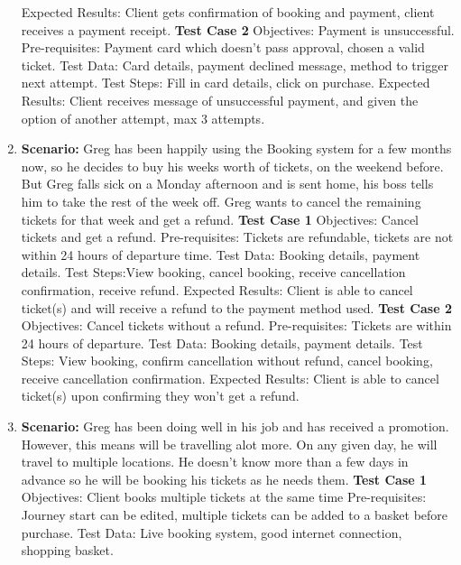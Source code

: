 \documentclass{article}
\begin{document}
\begin{enumerate}
		\subitem Expected Results: Client gets confirmation of booking and payment, client receives a payment receipt.
		\subitem \textbf{Test Case 2}
		\subitem Objectives: Payment is unsuccessful.
		\subitem Pre-requisites: Payment card which doesn't pass approval, chosen a valid ticket.
		\subitem Test Data: Card details, payment declined message, method to trigger next attempt.
		\subitem Test Steps: Fill in card details, click on purchase.
		\subitem Expected Results: Client receives message of unsuccessful payment, and given the option of another attempt, max 3 attempts.
		\newline
	\item \textbf{Scenario:} Greg has been happily using the Booking system for a few months now, so he decides to buy his weeks worth of tickets, on the weekend before. But Greg falls sick on a Monday afternoon and is sent home, his boss tells him to take the rest of the week off. Greg wants to cancel the remaining tickets for that week and get a refund.
		\subitem \textbf{Test Case 1}
		\subitem Objectives: Cancel tickets and get a refund.
		\subitem Pre-requisites: Tickets are refundable, tickets are not within 24 hours of departure time.
		\subitem Test Data: Booking details, payment details.
		\subitem Test Steps:View booking, cancel booking, receive cancellation confirmation, receive refund.
		\subitem Expected Results: Client is able to cancel ticket(s) and will receive a refund to the payment method used.
		\subitem \textbf{Test Case 2}
		\subitem Objectives: Cancel tickets without a refund.
		\subitem Pre-requisites: Tickets are within 24 hours of departure.
		\subitem Test Data: Booking details, payment details.
		\subitem Test Steps: View booking, confirm cancellation without refund, cancel booking, receive cancellation confirmation.
		\subitem Expected Results: Client is able to cancel ticket(s) upon confirming they won't get a refund.
		\newline
	\item \textbf{Scenario:} Greg has been doing well in his job and has received a promotion. However, this means will be travelling alot more. On any given day, he will travel to multiple locations. He doesn't know more than a few days in advance so he will be booking his tickets as he needs them.
		\subitem \textbf{Test Case 1}
		\subitem Objectives: Client books multiple tickets at the same time
		\subitem Pre-requisites: Journey start can be edited, multiple tickets can be added to a basket before purchase.
		\subitem Test Data: Live booking system, good internet connection, shopping basket.

\end{enumerate}
\end{document}
